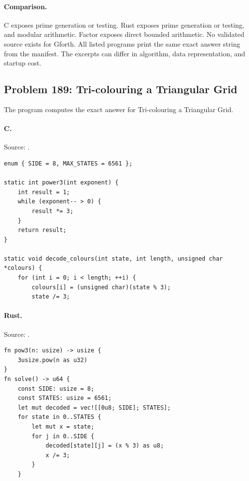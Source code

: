 \paragraph{Comparison.}
C exposes prime generation or testing. Rust exposes prime generation or testing, and modular arithmetic. Factor exposes direct bounded arithmetic.
No validated source exists for Gforth.
All listed programs print the same exact answer string from the manifest. The excerpts can differ in algorithm, data representation, and startup cost.

\subsection{Problem 189: Tri-colouring a Triangular Grid}
\label{walkthrough:p189}
The program computes the exact answer for Tri-colouring a Triangular Grid.

\paragraph{C.} Source: .
\begin{lstlisting}
enum { SIDE = 8, MAX_STATES = 6561 };

static int power3(int exponent) {
    int result = 1;
    while (exponent-- > 0) {
        result *= 3;
    }
    return result;
}

static void decode_colours(int state, int length, unsigned char *colours) {
    for (int i = 0; i < length; ++i) {
        colours[i] = (unsigned char)(state % 3);
        state /= 3;
\end{lstlisting}

\paragraph{Rust.} Source: .
\begin{lstlisting}
fn pow3(n: usize) -> usize {
    3usize.pow(n as u32)
}
fn solve() -> u64 {
    const SIDE: usize = 8;
    const STATES: usize = 6561;
    let mut decoded = vec![[0u8; SIDE]; STATES];
    for state in 0..STATES {
        let mut x = state;
        for j in 0..SIDE {
            decoded[state][j] = (x % 3) as u8;
            x /= 3;
        }
    }
\end{lstlisting}

